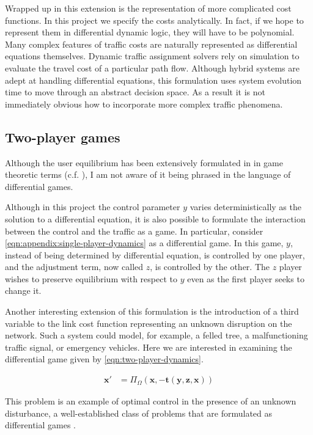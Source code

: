 Wrapped up in this extension is the representation of more complicated cost functions. In this project we specify the costs analytically. In fact, if we hope to represent them in differential dynamic logic, they will have to be polynomial. Many complex features of traffic costs are naturally represented as differential equations themselves.
Dynamic traffic assignment solvers rely on simulation to evaluate the travel cost of a particular path flow.
Although hybrid systems are adept at handling differential equations, this formulation uses system evolution time to move through an abstract decision space. As a result it is not immediately obvious how to incorporate more complex traffic phenomena.

\subsection{Two-player games}

Although the user equilibrium has been extensively formulated in in game theoretic terms (c.f. \citet{jin2015tap-games}), I am not aware of it being phrased in the language of differential games.

Although in this project the control parameter $y$ varies deterministically as the solution to a differential equation, it is also possible to formulate the interaction between the control and the traffic as a game.
In particular, consider \eqref{eqn:appendix:single-player-dynamics} as a differential game.
In this game, $y$, instead of being determined by differential equation, is controlled by one player, and the adjustment term, now called $z$, is controlled by the other.
The $z$ player wishes to preserve equilibrium with respect to $y$ even as the first player seeks to change it.

Another interesting extension of this formulation is the introduction of a third variable to the link cost function representing an unknown disruption on the network.
Such a system could model, for example, a felled tree, a malfunctioning traffic signal, or emergency vehicles.
Here we are interested in examining the differential game given by \eqref{eqn:two-player-dynamics}.

\begin{align}
    \mathbf{x}' &= \Pi_{\Omega} (\mathbf{x}, -\mathbf{t}(\mathbf{y}, \mathbf{z}, \mathbf{x}))\label{eqn:two-player-dynamics}
\end{align}

This problem is an example of optimal control in the presence of an unknown disturbance, a well-established class of problems that are formulated as differential games \citep{bardi2008optimal}.